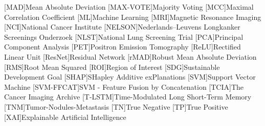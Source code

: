 \begin{flushleft}
\begin{acronym}[Abbreviations]
    [MAD]{Mean Absolute Deviation}
    [MAX-VOTE]{Majority Voting}
    [MCC]{Maximal Correlation Coefficient}
    [ML]{Machine Learning}
    [MRI]{Magnetic Resonance Imaging}
    [NCI]{National Cancer Institute}
    [NELSON]{Nederlands–Leuvens Longkanker Screenings Onderzoek}
    [NLST]{National Lung Screening Trial}
    [PCA]{Principal Component Analysis}
    [PET]{Positron Emission Tomography}
    [ReLU]{Rectified Linear Unit}
    [ResNet]{Residual Network}
    [rMAD]{Robust Mean Absolute Deviation}
    [RMS]{Root Mean Squared}
    [ROI]{Region of Interest}
    [SDG]{Sustainable Development Goal}
    [SHAP]{SHapley Additive exPlanations}
    [SVM]{Support Vector Machine}
    [SVM-FFCAT]{SVM - Feature Fusion by Concatenation}
    [TCIA]{The Cancer Imaging Archive}
    [T-LSTM]{Time-Modulated Long Short-Term Memory}
    [TNM]{Tumor-Nodules-Metastasis}
    [TN]{True Negative}
    [TP]{True Positive}
    [XAI]{Explainable Artificial Intelligence}
    
\end{acronym}

\end{flushleft}